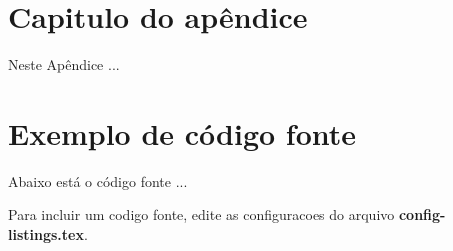 
\chapter{Capitulo do apêndice}
\label{chap:apendice-chap-1}

Neste Apêndice ...


\chapter{Exemplo de código fonte}
\label{chap:codigo-fonte}

Abaixo está o código fonte ...

Para incluir um codigo fonte, edite as configuracoes do arquivo \textbf{config-listings.tex}.


